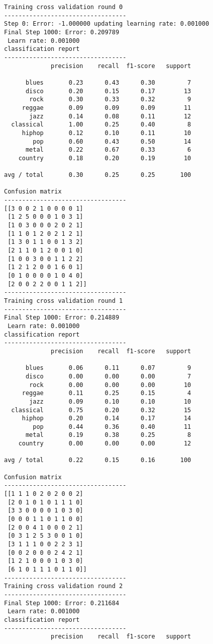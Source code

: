 \documentclass{article}
\begin{document}
    \begin{Verbatim}[commandchars=\\\{\}]
Training cross validation round 0
----------------------------------
Step 0: Error: -1.000000 updating learning rate: 0.001000
Final Step 1000: Error: 0.209789 
 Learn rate: 0.001000
classification report 
----------------------------------
             precision    recall  f1-score   support

      blues       0.23      0.43      0.30         7
      disco       0.20      0.15      0.17        13
       rock       0.30      0.33      0.32         9
     reggae       0.09      0.09      0.09        11
       jazz       0.14      0.08      0.11        12
  classical       1.00      0.25      0.40         8
     hiphop       0.12      0.10      0.11        10
        pop       0.60      0.43      0.50        14
      metal       0.22      0.67      0.33         6
    country       0.18      0.20      0.19        10

avg / total       0.30      0.25      0.25       100

Confusion matrix
----------------------------------
[[3 0 0 2 1 0 0 0 0 1]
 [1 2 5 0 0 0 1 0 3 1]
 [1 0 3 0 0 0 2 0 2 1]
 [1 1 0 1 2 0 2 1 2 1]
 [1 3 0 1 1 0 0 1 3 2]
 [2 1 1 0 1 2 0 0 1 0]
 [1 0 0 3 0 0 1 1 2 2]
 [1 2 1 2 0 0 1 6 0 1]
 [0 1 0 0 0 0 1 0 4 0]
 [2 0 0 2 2 0 0 1 1 2]]
----------------------------------
Training cross validation round 1
----------------------------------
Final Step 1000: Error: 0.214889 
 Learn rate: 0.001000
classification report 
----------------------------------
             precision    recall  f1-score   support

      blues       0.06      0.11      0.07         9
      disco       0.00      0.00      0.00         7
       rock       0.00      0.00      0.00        10
     reggae       0.11      0.25      0.15         4
       jazz       0.09      0.10      0.10        10
  classical       0.75      0.20      0.32        15
     hiphop       0.20      0.14      0.17        14
        pop       0.44      0.36      0.40        11
      metal       0.19      0.38      0.25         8
    country       0.00      0.00      0.00        12

avg / total       0.22      0.15      0.16       100

Confusion matrix
----------------------------------
[[1 1 1 0 2 0 2 0 0 2]
 [2 0 1 0 1 0 1 1 1 0]
 [3 3 0 0 0 0 1 0 3 0]
 [0 0 0 1 1 0 1 1 0 0]
 [2 0 0 4 1 0 0 0 2 1]
 [0 3 1 2 5 3 0 0 1 0]
 [3 1 1 1 0 0 2 2 3 1]
 [0 0 2 0 0 0 2 4 2 1]
 [1 2 1 0 0 0 1 0 3 0]
 [6 1 0 1 1 1 0 1 1 0]]
----------------------------------
Training cross validation round 2
----------------------------------
Final Step 1000: Error: 0.211684 
 Learn rate: 0.001000
classification report 
----------------------------------
             precision    recall  f1-score   support


\end{Verbatim}
\end{document}
